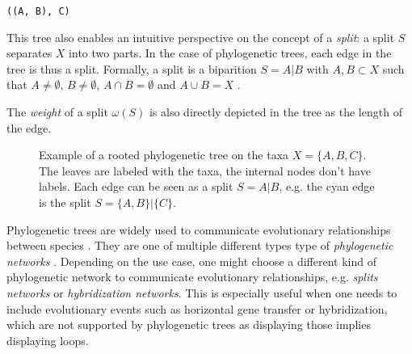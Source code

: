 \texttt{((A, B), C)}

This tree also enables an intuitive perspective on the concept of a
\textit{split}: a split $S$ separates $X$ into two parts. In the case of
phylogenetic trees, each edge in the tree is thus a split. Formally, a split is
a biparition $S=A|B$ with $A, B \subset X$ such that $A \neq \emptyset$, $B \neq
\emptyset$, $A \cap B = \emptyset$ and $A \cup B = X$
\cite{scornavaccaSplitsUnrootedPhylogenetic2010}.

The \textit{weight} of a split $\omega(S)$ is also directly depicted in the tree
as the length of the edge. 

\begin{figure}
  \centering
  \caption[Example of a rooted phylogenetic tree]{Example of a rooted
  phylogenetic tree on the taxa $X = \{A, B, C\}$. The leaves are labeled with
  the taxa, the internal nodes don't have labels. Each edge can be seen as a
  split $S=A|B$, e.g. the cyan edge is the split $S = \{A, B\} | \{C\}$.}
  \label{fig:exampleTree}
\end{figure}

Phylogenetic trees are widely used to communicate evolutionary relationships
between species
\cite{mandalComparativeGenomeAnalysis2022,winkworthComparativeAnalysesComplete2022,ayala-usmaWholeGenomeDuplication2021}.
They are one of multiple different types type of \textit{phylogenetic networks}
\cite{husonApplicationPhylogeneticNetworks2006}. Depending on the use case, one
might choose a different kind of phylogenetic network to communicate
evolutionary relationships, e.g. \textit{splits networks} or
\textit{hybridization networks}. This is especially useful when one needs to
include evolutionary events such as horizontal gene transfer or hybridization,
which are not supported by phylogenetic trees as displaying those implies
displaying loops. 

